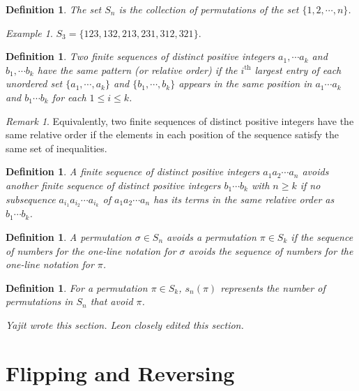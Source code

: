 \documentclass[11pt,letterpaper,twoside,english]{article}
\theoremstyle{theorem}
\newtheorem{definition}[theorem]{Definition}
\theoremstyle{remark}
\newtheorem{remark}[theorem]{Remark}
\newtheorem{example}[theorem]{Example}
\begin{document}
\begin{definition}
The set $S_n$ is the collection of permutations of the set $\{1,2,\cdots, n\}$. 
\end{definition}

\begin{example}
$S_3=\{123,132,213,231,312,321\}$. 
\end{example}








\begin{definition}
Two finite sequences of distinct positive integers $a_1,\cdots a_k$ and $b_1,\cdots b_k$ have the same pattern (or relative order) if the $i^\text{th}$ largest entry of each unordered set $\{a_1,\cdots,a_k\}$ and $\{b_1,\cdots, b_k\}$ appears in the same position in $a_1\cdots a_k$ and $b_1\cdots b_k$ for each $1\le i\le k$. 
\end{definition}

\begin{remark}
Equivalently, two finite sequences of distinct positive integers have the same relative order if the elements in each position of the sequence satisfy the same set of inequalities.
\end{remark}

\begin{definition}
A finite sequence of distinct positive integers $a_1a_2\cdots a_n$ avoids another finite sequence of distinct positive integers $b_1\cdots b_k$ with $n\ge k$ if no subsequence $a_{i_1}a_{i_2}\cdots a_{i_k}$ of $a_1a_2\cdots a_n$ has its terms in the same relative order as $b_1\cdots b_k$. 
\end{definition}


\begin{definition} 
A permutation $\sigma\in S_n$ avoids a permutation $\pi\in S_k$ if the sequence of numbers for the one-line notation for $\sigma$ avoids the sequence of numbers for the one-line notation for $\pi$.
\end{definition}

\begin{definition}
For a permutation $\pi\in S_k$, $s_n(\pi)$ represents the number of permutations in $S_n$ that avoid $\pi$. 
\end{definition}

\emph{Yajit wrote this section. Leon closely edited this section.}


\section{Flipping and Reversing}
\end{document}
